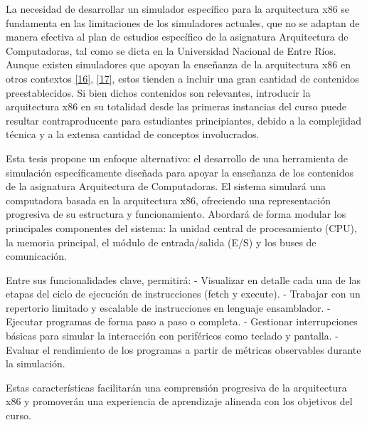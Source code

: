 \documentclass[12pt,oneside]{templates/unerthesis}
\begin{document}
La necesidad de desarrollar un simulador específico para la arquitectura x86 se fundamenta en las limitaciones de los simuladores actuales, que no se adaptan de manera efectiva al plan de estudios específico de la asignatura Arquitectura de Computadoras, tal como se dicta en la Universidad Nacional de Entre Ríos. Aunque existen simuladores que apoyan la enseñanza de la arquitectura x86 en otros contextos \protect\hyperlink{ref-radivojevic_design_2011}{{[}16{]}}, \protect\hyperlink{ref-nikolic_survey_2009}{{[}17{]}}, estos tienden a incluir una gran cantidad de contenidos preestablecidos. Si bien dichos contenidos son relevantes, introducir la arquitectura x86 en su totalidad desde las primeras instancias del curso puede resultar contraproducente para estudiantes principiantes, debido a la complejidad técnica y a la extensa cantidad de conceptos involucrados.

Esta tesis propone un enfoque alternativo: el desarrollo de una herramienta de simulación específicamente diseñada para apoyar la enseñanza de los contenidos de la asignatura Arquitectura de Computadoras. El sistema simulará una computadora basada en la arquitectura x86, ofreciendo una representación progresiva de su estructura y funcionamiento. Abordará de forma modular los principales componentes del sistema: la unidad central de procesamiento (CPU), la memoria principal, el módulo de entrada/salida (E/S) y los buses de comunicación.

Entre sus funcionalidades clave, permitirá:
- Visualizar en detalle cada una de las etapas del ciclo de ejecución de instrucciones (fetch y execute).
- Trabajar con un repertorio limitado y escalable de instrucciones en lenguaje ensamblador.
- Ejecutar programas de forma paso a paso o completa.
- Gestionar interrupciones básicas para simular la interacción con periféricos como teclado y pantalla.
- Evaluar el rendimiento de los programas a partir de métricas observables durante la simulación.

Estas características facilitarán una comprensión progresiva de la arquitectura x86 y promoverán una experiencia de aprendizaje alineada con los objetivos del curso.
\end{document}
